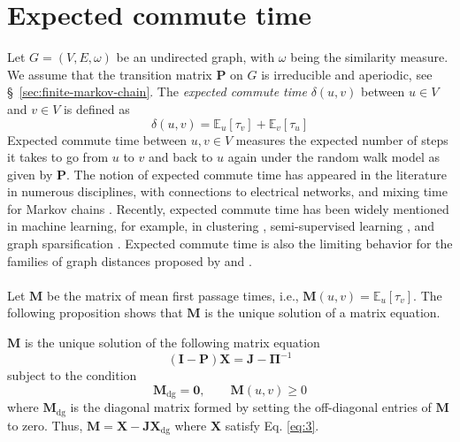 \section{Expected commute time}
\label{sec:expect-comm-time}
Let $G = (V,E,\omega)$ be an undirected graph, with $\omega$ being the
similarity measure. We assume that the transition matrix
$\mathbf{P}$ on $G$ is irreducible and aperiodic, see
\S~\ref{sec:finite-markov-chain}. The {\em expected commute time}
$\delta(u,v)$ between $u \in V$ and $v \in V$ is defined as
\begin{equation}
  \label{eq:25}
  \delta(u,v) = \mathbb{E}_{u}[\tau_v] + \mathbb{E}_{v}[\tau_u] 
\end{equation}
%
Expected commute time between $u,v \in V$ measures the expected number
of steps it takes to go from $u$ to $v$ and back to $u$ again under the
random walk model as given by $\mathbf{P}$. The notion of expected
commute time has appeared in the literature in numerous disciplines, with
connections to electrical networks,
\citep{doyle84:_random_walks_elect_networ} and mixing time for Markov
chains
\citep{lovasz96:_random_graph,levin09:_markov_chain_mixin_times}.
Recently, expected commute time has been widely mentioned in machine
learning, for example, in clustering
\citep{saerens04,yen07:_graph,qui07:_clust}, semi-supervised learning
\citep{szummer01:_partial_markov,zhou04:_learn,zhou04:_learn_label_unlab,zhu03:_semi_super_learn_using_gauss},
and graph sparsification \citep{spielmand08:_graph}. Expected commute
time is also the limiting behavior for the families of
graph distances proposed by
\citet{yen08:_famil_of_dissim_measur_between} and
\citet{chebotarev08:_new_famil_of_graph_distan}. \\ \\
%
\noindent Let $\mathbf{M}$ be the matrix of mean first passage times,
i.e., $\mathbf{M}(u,v) = \mathbb{E}_{u}[\tau_v]$. The following
proposition shows that $\mathbf{M}$ is the unique solution of a 
matrix equation.
\begin{proposition}
  \label{prop:4}
 $\mathbf{M}$ is the unique solution of the following matrix equation
  \begin{equation}
    \label{eq:3}
   (\mathbf{I} - \mathbf{P})\mathbf{X} = \mathbf{J} - \bm{\Pi}^{-1}
  \end{equation}
  subject to the condition 
  \begin{equation}
    \label{eq:32}
 \mathbf{M}_{\mathrm{dg}} = \mathbf{0}, \qquad \mathbf{M}(u,v) \geq 0   
  \end{equation}
  where $\mathbf{M}_{\mathrm{dg}}$ is the diagonal matrix formed
    by setting the off-diagonal entries of $\mathbf{M}$ to zero.
    Thus, $\mathbf{M} = \mathbf{X} -
    \mathbf{J}\mathbf{X}_{\mathrm{dg}}$ where $\mathbf{X}$ satisfy
    Eq. \eqref{eq:3}.
\end{proposition}

